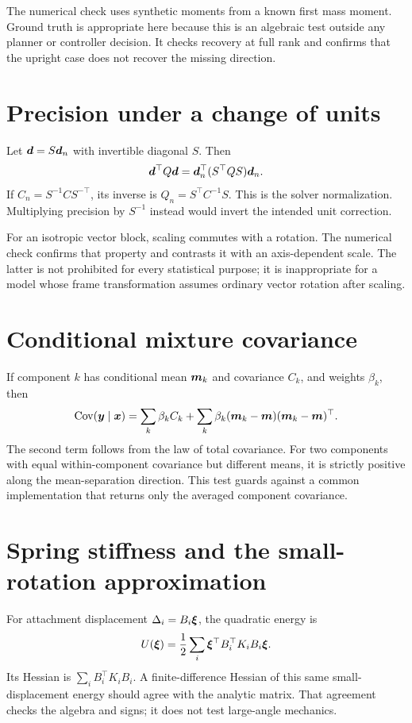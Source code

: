 The numerical check uses synthetic moments from a known first mass moment. Ground truth is appropriate here because this is an algebraic test outside any planner or controller decision. It checks recovery at full rank and confirms that the upright case does not recover the missing direction.

\section{Precision under a change of units}

Let $\bm{d}=S\bm{d}_n$ with invertible diagonal $S$. Then
\begin{equation}
\bm{d}^\top Q\bm{d}=\bm{d}_n^\top(S^\top QS)\bm{d}_n.
\end{equation}
If $C_n=S^{-1}CS^{-\top}$, its inverse is $Q_n=S^\top C^{-1}S$. This is the solver normalization. Multiplying precision by $S^{-1}$ instead would invert the intended unit correction.

For an isotropic vector block, scaling commutes with a rotation. The numerical check confirms that property and contrasts it with an axis-dependent scale. The latter is not prohibited for every statistical purpose; it is inappropriate for a model whose frame transformation assumes ordinary vector rotation after scaling.

\section{Conditional mixture covariance}

If component $k$ has conditional mean $\bm{m}_k$ and covariance $C_k$, and weights $\beta_k$, then
\begin{equation}
\operatorname{Cov}(\bm{y}\mid\bm{x})=\sum_k\beta_kC_k
+\sum_k\beta_k(\bm{m}_k-\bm{m})(\bm{m}_k-\bm{m})^\top.
\end{equation}
The second term follows from the law of total covariance. For two components with equal within-component covariance but different means, it is strictly positive along the mean-separation direction. This test guards against a common implementation that returns only the averaged component covariance.

\section{Spring stiffness and the small-rotation approximation}

For attachment displacement $\Delta_i=B_i\bm{\xi}$, the quadratic energy is
\begin{equation}
U(\bm{\xi})=\frac12\sum_i\bm{\xi}^\top B_i^\top K_iB_i\bm{\xi}.
\end{equation}
Its Hessian is $\sum_iB_i^\top K_iB_i$. A finite-difference Hessian of this same small-displacement energy should agree with the analytic matrix. That agreement checks the algebra and signs; it does not test large-angle mechanics.

